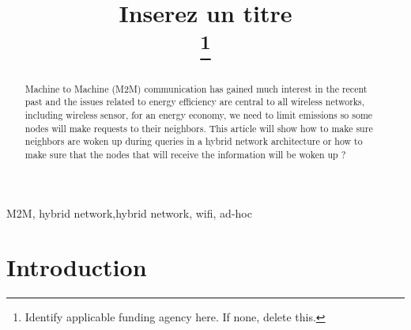 \documentclass[conference]{IEEEtran}
\begin{document}
\title{Inserez un titre \\
\thanks{Identify applicable funding agency here. If none, delete this.}
}

\author{
\and
{}
\and
{}
}

\maketitle

\begin{abstract}
Machine to Machine (M2M) communication has gained much interest in the recent past and the issues related to energy efficiency are central to all wireless networks, including wireless sensor, for an energy economy, we need to limit emissions so some nodes will make requests to their neighbors.  This article will show how to make sure neighbors are woken up during queries in a hybrid network architecture or how to make sure that the nodes that will receive the information will be woken up ?
\end{abstract}

\begin{IEEEkeywords}
M2M, hybrid network,hybrid network, wifi, ad-hoc
\end{IEEEkeywords}

\section{Introduction}
\end{document}

